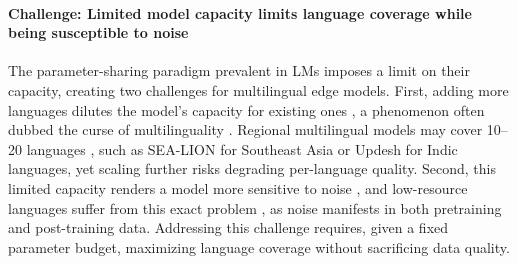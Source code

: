\documentclass[11pt,a4paper]{article}
\begin{document}
\paragraph{Challenge: Limited model capacity \iconmemory{} limits language coverage while being susceptible to noise \icondata{}}
The parameter-sharing paradigm prevalent in LMs imposes a limit on their capacity, creating two challenges for multilingual edge models.
First, adding more languages dilutes the model's capacity for existing ones \citep{doddapaneni2025primer},
a phenomenon often dubbed the curse of multilinguality \citep[\textit{inter alia}]{chang-etal-2024-multilinguality,longpre2025atlasadaptivetransferscaling}.
Regional multilingual models may cover 10--20 languages \citep{pava2025mind}, such as SEA-LION \citep{ng2025sealionsoutheastasianlanguages} for Southeast Asia or Updesh \citep{chitale2026updeshsynthesizinggroundedinstruction} for Indic languages, yet scaling further risks degrading per-language quality.
Second, this limited capacity renders a model more sensitive to noise \citep{havrilla2024understandingeffectnoiseLLM}, and low-resource languages suffer from this exact problem \citep{kreutzer-etal-2022-quality},
as noise manifests in both pretraining \citep{chen2024understanding,longpre-etal-2024-pretrainers} and post-training \citep{ijcai2024p403,zhu-etal-2024-fine} data.
Addressing this challenge requires, given a fixed parameter budget, maximizing language coverage without sacrificing data quality.
\end{document}
